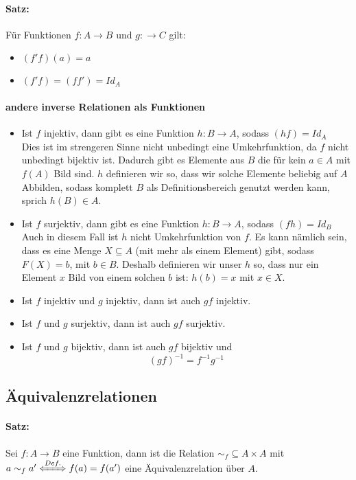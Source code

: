 \documentclass[10pt,a4paper]{article}
\begin{document}
\paragraph{Satz:}Für Funktionen $f:A\rightarrow B$ und $g:\rightarrow C$ gilt:
\begin{itemize}
\item $(f'f)(a)=a$
\item $(f'f)=(ff')=Id_A$
\end{itemize}
\paragraph{andere inverse Relationen als Funktionen}
\begin{itemize}
\item Ist $f$ injektiv, dann gibt es eine Funktion $h:B\rightarrow A$, sodass $(hf)=Id_A$\\
Dies ist im strengeren Sinne nicht unbedingt eine Umkehrfunktion, da $f$ nicht unbedingt bijektiv ist. Dadurch gibt es Elemente aus $B$ die für kein $a\in A$ mit $f(A)$ Bild sind.
$h$ definieren wir so, dass wir solche Elemente beliebig auf $A$ Abbilden, sodass komplett $B$ als Definitionsbereich genutzt werden kann, sprich $h(B)\in A$.
\item Ist $f$ surjektiv, dann gibt es eine Funktion $h:B\rightarrow A$, sodass $(fh)=Id_B$\\
Auch in diesem Fall ist $h$ nicht Umkehrfunktion von $f$. Es kann nämlich sein, dass es eine Menge $X\subseteq A$ (mit mehr als einem Element) gibt, sodass $F(X)=b$, mit $b\in B$.
Deshalb definieren wir unser $h$ so, dass nur ein Element $x$ Bild von einem solchen $b$ ist: $h(b)=x$ mit $x\in X$.
\item Ist $f$ injektiv und $g$ injektiv, dann ist auch $gf$ injektiv.
\item Ist $f$ und $g$ surjektiv, dann ist auch $gf$ surjektiv.
\item Ist $f$ und $g$ bijektiv, dann ist auch $gf$ bijektiv und
\[
(gf)^{-1}=f^{-1}g^{-1}
\]
\end{itemize}
\subsection{Äquivalenzrelationen}
\paragraph{Satz:}Sei $f:A\rightarrow B$ eine Funktion, dann ist die Relation $\sim_f\subseteq A\times A$ mit $a\sim_f a' \xLeftrightarrow{Def.} f(a)=f(a')$ eine Äquivalenzrelation über $A$.
\end{document}
